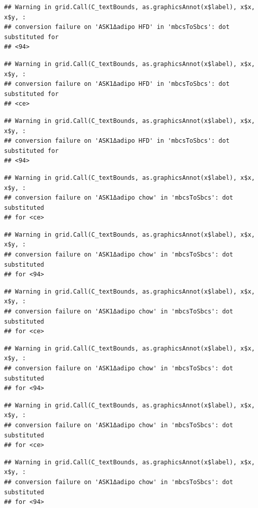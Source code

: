 \documentclass[]{book}
\begin{document}
\begin{verbatim}
## Warning in grid.Call(C_textBounds, as.graphicsAnnot(x$label), x$x, x$y, :
## conversion failure on 'ASK1Δadipo HFD' in 'mbcsToSbcs': dot substituted for
## <94>
\end{verbatim}

\begin{verbatim}
## Warning in grid.Call(C_textBounds, as.graphicsAnnot(x$label), x$x, x$y, :
## conversion failure on 'ASK1Δadipo HFD' in 'mbcsToSbcs': dot substituted for
## <ce>
\end{verbatim}

\begin{verbatim}
## Warning in grid.Call(C_textBounds, as.graphicsAnnot(x$label), x$x, x$y, :
## conversion failure on 'ASK1Δadipo HFD' in 'mbcsToSbcs': dot substituted for
## <94>
\end{verbatim}

\begin{verbatim}
## Warning in grid.Call(C_textBounds, as.graphicsAnnot(x$label), x$x, x$y, :
## conversion failure on 'ASK1Δadipo chow' in 'mbcsToSbcs': dot substituted
## for <ce>
\end{verbatim}

\begin{verbatim}
## Warning in grid.Call(C_textBounds, as.graphicsAnnot(x$label), x$x, x$y, :
## conversion failure on 'ASK1Δadipo chow' in 'mbcsToSbcs': dot substituted
## for <94>
\end{verbatim}

\begin{verbatim}
## Warning in grid.Call(C_textBounds, as.graphicsAnnot(x$label), x$x, x$y, :
## conversion failure on 'ASK1Δadipo chow' in 'mbcsToSbcs': dot substituted
## for <ce>
\end{verbatim}

\begin{verbatim}
## Warning in grid.Call(C_textBounds, as.graphicsAnnot(x$label), x$x, x$y, :
## conversion failure on 'ASK1Δadipo chow' in 'mbcsToSbcs': dot substituted
## for <94>
\end{verbatim}

\begin{verbatim}
## Warning in grid.Call(C_textBounds, as.graphicsAnnot(x$label), x$x, x$y, :
## conversion failure on 'ASK1Δadipo chow' in 'mbcsToSbcs': dot substituted
## for <ce>
\end{verbatim}

\begin{verbatim}
## Warning in grid.Call(C_textBounds, as.graphicsAnnot(x$label), x$x, x$y, :
## conversion failure on 'ASK1Δadipo chow' in 'mbcsToSbcs': dot substituted
## for <94>
\end{verbatim}
\end{document}
